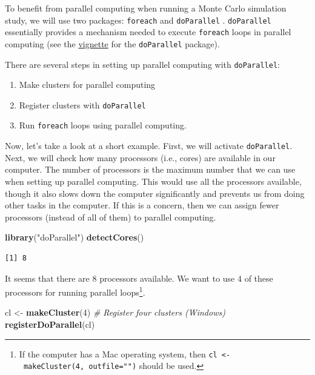 \documentclass[
]{book}
\newenvironment{Shaded}{\begin{snugshade}}{\end{snugshade}}
\newcommand{\CommentTok}[1]{\textcolor[rgb]{0.56,0.35,0.01}{\textit{#1}}}
\newcommand{\DecValTok}[1]{\textcolor[rgb]{0.00,0.00,0.81}{#1}}
\newcommand{\KeywordTok}[1]{\textcolor[rgb]{0.13,0.29,0.53}{\textbf{#1}}}
\newcommand{\NormalTok}[1]{#1}
\newcommand{\StringTok}[1]{\textcolor[rgb]{0.31,0.60,0.02}{#1}}
\providecommand{\tightlist}{%
  \setlength{\itemsep}{0pt}\setlength{\parskip}{0pt}}
\begin{document}
To benefit from parallel computing when running a Monte Carlo simulation study, we will use two packages: \texttt{foreach} \citep{R-foreach} and \texttt{doParallel} \citep{R-doParallel}. \texttt{doParallel} essentially provides a mechanism
needed to execute \texttt{foreach} loops in parallel computing (see the \href{https://cran.r-project.org/web/packages/doParallel/vignettes/gettingstartedParallel.pdf}{vignette} for the \texttt{doParallel} package).

There are several steps in setting up parallel computing with \texttt{doParallel}:

\begin{enumerate}
\def\labelenumi{\arabic{enumi}.}
\tightlist
\item
  Make clusters for parallel computing
\item
  Register clusters with \texttt{doParallel}
\item
  Run \texttt{foreach} loops using parallel computing.
\end{enumerate}

Now, let's take a look at a short example. First, we will activate \texttt{doParallel}. Next, we will check how many processors (i.e., cores) are available in our computer. The number of processors is the maximum number that we can use when setting up parallel computing. This would use all the processors available, though it also slows down the computer significantly and prevents us from doing other tasks in the computer. If this is a concern, then we can assign fewer processors (instead of all of them) to parallel computing.

\begin{Shaded}
\begin{Highlighting}[]
\KeywordTok{library}\NormalTok{(}\StringTok{"doParallel"}\NormalTok{)}
\KeywordTok{detectCores}\NormalTok{()}
\end{Highlighting}
\end{Shaded}

\begin{verbatim}
[1] 8
\end{verbatim}

It seems that there are 8 processors available. We want to use 4 of these processors for running parallel loops\footnote{If the computer has a Mac operating system, then \texttt{cl\ \textless{}-\ makeCluster(4,\ outfile="")} should be used.}.

\begin{Shaded}
\begin{Highlighting}[]
\NormalTok{cl <-}\StringTok{ }\KeywordTok{makeCluster}\NormalTok{(}\DecValTok{4}\NormalTok{) }\CommentTok{# Register four clusters (Windows)}
\KeywordTok{registerDoParallel}\NormalTok{(cl)}
\end{Highlighting}
\end{Shaded}
\end{document}
